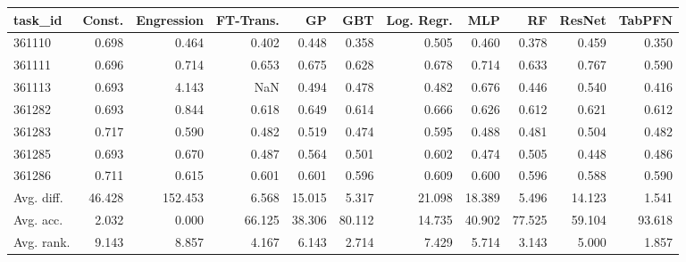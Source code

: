 \begin{tabular}{lrrrrrrrrrr}
\toprule
task\_id & Const. & Engression & FT-Trans. & GP & GBT & Log. Regr. & MLP & RF & ResNet & TabPFN \\
\midrule
361110 & 0.698 & 0.464 & 0.402 & 0.448 & 0.358 & 0.505 & 0.460 & 0.378 & 0.459 & 0.350 \\
361111 & 0.696 & 0.714 & 0.653 & 0.675 & 0.628 & 0.678 & 0.714 & 0.633 & 0.767 & 0.590 \\
361113 & 0.693 & 4.143 & NaN & 0.494 & 0.478 & 0.482 & 0.676 & 0.446 & 0.540 & 0.416 \\
361282 & 0.693 & 0.844 & 0.618 & 0.649 & 0.614 & 0.666 & 0.626 & 0.612 & 0.621 & 0.612 \\
361283 & 0.717 & 0.590 & 0.482 & 0.519 & 0.474 & 0.595 & 0.488 & 0.481 & 0.504 & 0.482 \\
361285 & 0.693 & 0.670 & 0.487 & 0.564 & 0.501 & 0.602 & 0.474 & 0.505 & 0.448 & 0.486 \\
361286 & 0.711 & 0.615 & 0.601 & 0.601 & 0.596 & 0.609 & 0.600 & 0.596 & 0.588 & 0.590 \\
Avg. diff. & 46.428 & 152.453 & 6.568 & 15.015 & 5.317 & 21.098 & 18.389 & 5.496 & 14.123 & 1.541 \\
Avg. acc. & 2.032 & 0.000 & 66.125 & 38.306 & 80.112 & 14.735 & 40.902 & 77.525 & 59.104 & 93.618 \\
Avg. rank. & 9.143 & 8.857 & 4.167 & 6.143 & 2.714 & 7.429 & 5.714 & 3.143 & 5.000 & 1.857 \\
\bottomrule
\end{tabular}
